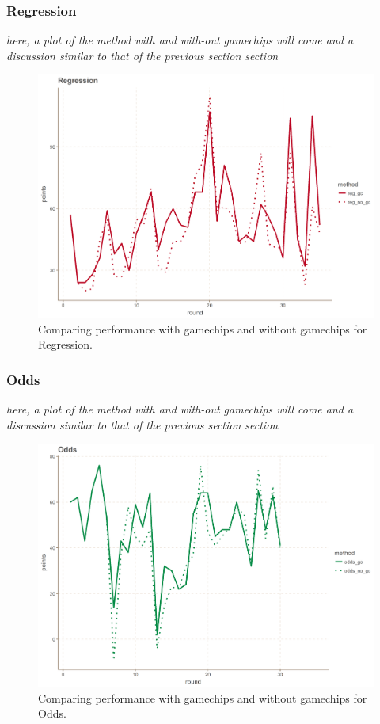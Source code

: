 \subsubsection{Regression}
\textit{here, a plot of the method with and with-out gamechips will come and a discussion similar to that of the previous section section}

\begin{figure}[H]
    \centering
    \includegraphics[scale=0.5]{fig/chapter_7/reg_gc_no_gc.png}
    \caption{Comparing performance with gamechips and without gamechips for Regression.}
\label{fig:reg_gc_no_gc}    
\end{figure}

\subsubsection{Odds}
\textit{here, a plot of the method with and with-out gamechips will come and a discussion similar to that of the previous section section}

\begin{figure}[H]
    \centering
    \includegraphics[scale=0.5]{fig/chapter_7/odds_gc_no_gc.png}
    \caption{Comparing performance with gamechips and without gamechips for Odds.}
\label{fig:odds_gc_no_gc}    
\end{figure}

